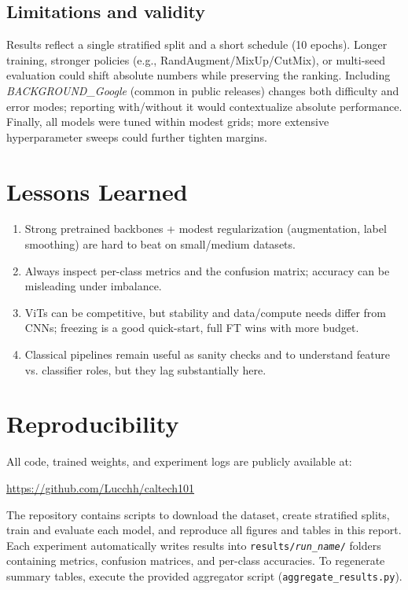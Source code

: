 \documentclass[11pt]{article}
\begin{document}
\subsection{Limitations and validity}
Results reflect a single stratified split and a short schedule (10 epochs). Longer training, stronger policies (e.g., RandAugment/MixUp/CutMix), or multi-seed evaluation could shift absolute numbers while preserving the ranking. Including \emph{BACKGROUND\_Google} (common in public releases) changes both difficulty and error modes; reporting with/without it would contextualize absolute performance. Finally, all models were tuned within modest grids; more extensive hyperparameter sweeps could further tighten margins.

\section{Lessons Learned}
\begin{enumerate}[leftmargin=*]
  \item Strong pretrained backbones + modest regularization (augmentation, label smoothing) are hard to beat on small/medium datasets.
  \item Always inspect per-class metrics and the confusion matrix; accuracy can be misleading under imbalance.
  \item ViTs can be competitive, but stability and data/compute needs differ from CNNs; freezing is a good quick-start, full FT wins with more budget.
  \item Classical pipelines remain useful as sanity checks and to understand feature vs. classifier roles, but they lag substantially here.
\end{enumerate}

\section{Reproducibility}
All code, trained weights, and experiment logs are publicly available at:
\begin{center}
  \url{https://github.com/Lucchh/caltech101}
\end{center}
The repository contains scripts to download the dataset, create stratified splits, train and evaluate each model,
and reproduce all figures and tables in this report. Each experiment automatically writes results into
\texttt{results/\textit{run\_name}/} folders containing metrics, confusion matrices, and per-class accuracies.
To regenerate summary tables, execute the provided aggregator script (\texttt{aggregate\_results.py}).
\end{document}

